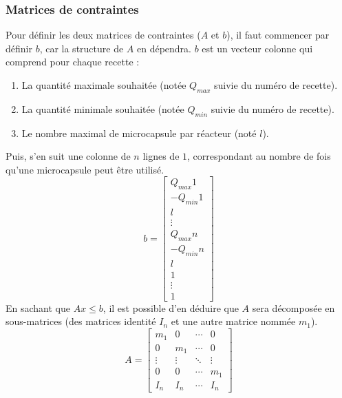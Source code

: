 \subsubsection{Matrices de contraintes}\label{subsubsection:contraintes}
Pour définir les deux matrices de contraintes ($A$ et $b$), il faut commencer par définir $b$, car la structure de $A$ en dépendra.
$b$ est un vecteur colonne qui comprend pour chaque recette :
\begin{enumerate}
    \item La quantité maximale souhaitée (notée $Q_{max}$ suivie du numéro de recette).
    \item La quantité minimale souhaitée (notée $Q_{min}$ suivie du numéro de recette).
    \item Le nombre maximal de \gls{microcapsule} par réacteur (noté $l$).
\end{enumerate}
Puis, s'en suit une colonne de $n$ lignes de $1$, correspondant au nombre de fois qu'une \gls{microcapsule} peut être utilisé.
\begin{equation}
    b = \left[
        \begin{array}{c}
            Q_{max}1\\
            -Q_{min}1\\
            l\\
            \vdots\\
            Q_{max}n\\
            -Q_{min}n\\
            l\\
                1 \\
                \vdots \\
                1
        \end{array}
    \right]
\end{equation}
En sachant que $Ax \leq b$, il est possible d'en déduire que $A$ sera décomposée en sous-matrices (des matrices identité $I_n$ et une autre matrice nommée $m_1$).
\begin{equation}
    A = \left[\begin{array}{cccc}
        m_1    & 0       & \cdots & 0\\
        0      & m_1     & \cdots & 0\\
        \vdots & \vdots  & \ddots & \vdots \\
        0      & 0       & \cdots &  m_1 \\
        I_n    & I_n     & \cdots &  I_n
    \end{array}\right]
\end{equation}
